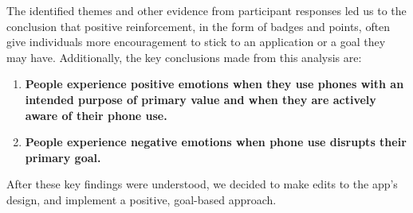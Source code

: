 \documentclass[12pt, title page, manuscript, nonacm]{acmart}
\begin{document}
The identified themes and other evidence from participant responses led us to the conclusion that positive reinforcement, in the form of badges and points, often give individuals more encouragement to stick to an application or a goal they may have. Additionally, the key conclusions made from this analysis are:
\begin{enumerate}
    \item \textbf{People experience positive emotions when they use phones with an intended purpose of primary value and when they are actively aware of their phone use.}
    \item \textbf{People experience negative emotions when phone use disrupts their primary goal.}
\end{enumerate}
After these key findings were understood, we decided to make edits to the app's design, and implement a positive, goal-based approach\cite{kim2020understanding}.
\end{document}

